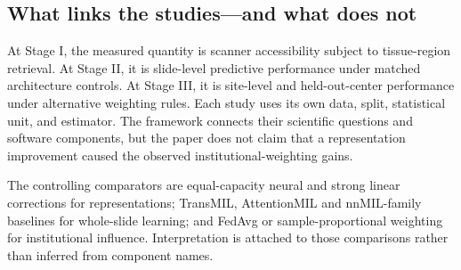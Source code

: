 \subsection{What links the studies---and what does not}
At Stage I, the measured quantity is scanner accessibility subject to tissue-region retrieval. At Stage II, it is slide-level predictive performance under matched architecture controls. At Stage III, it is site-level and held-out-center performance under alternative weighting rules. Each study uses its own data, split, statistical unit, and estimator. The framework connects their scientific questions and software components, but the paper does not claim that a representation improvement caused the observed institutional-weighting gains.

The controlling comparators are equal-capacity neural and strong linear corrections for representations; TransMIL, AttentionMIL and nnMIL-family baselines for whole-slide learning; and FedAvg or sample-proportional weighting for institutional influence. Interpretation is attached to those comparisons rather than inferred from component names.
